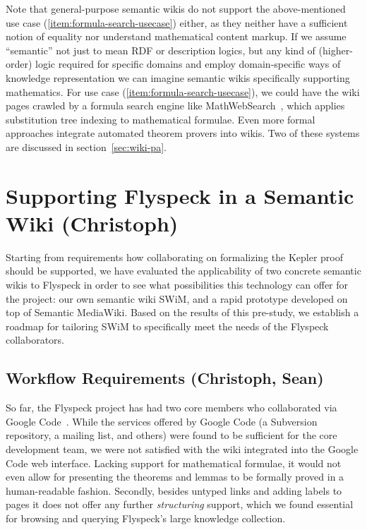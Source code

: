 \documentclass{llncs}
\begin{document}
Note that general-purpose semantic wikis do not support the above-mentioned use case
(\ref{item:formula-search-usecase}) either, as they neither have a sufficient notion of
equality nor understand mathematical content markup.  If we assume ``semantic'' not just
to mean RDF or description logics, but any kind of (higher-order) logic required for
specific domains and employ domain-specific ways of knowledge representation we can
imagine semantic wikis specifically supporting mathematics.  For use case
(\ref{item:formula-search-usecase}), we could have the wiki pages crawled by a formula
search engine like MathWebSearch~\cite{KohSuc:asemf06}, which applies substitution tree
indexing to mathematical formulae.  Even more formal approaches integrate automated
theorem provers into wikis.  Two of these systems are discussed in
section~\ref{sec:wiki-pa}.

\section{Supporting Flyspeck in a Semantic Wiki (Christoph)}

Starting from requirements how collaborating on formalizing the Kepler proof should be
supported, we have evaluated the applicability of two concrete semantic wikis to Flyspeck
in order to see what possibilities this technology can offer for the project:  our own
semantic wiki SWiM, and a rapid prototype developed on top of Semantic MediaWiki.  Based on the
results of this pre-study, we establish a roadmap for tailoring SWiM to specifically meet
the needs of the Flyspeck collaborators.

\subsection{Workflow Requirements (Christoph, Sean)}
\label{sec:req}

So far, the Flyspeck project has had two core members who
collaborated via Google Code~\cite{flyspeck:web}.  While the services offered by Google
Code (a Subversion repository, a mailing list, and others) were found to be sufficient for
the core development team, we were not satisfied with the wiki integrated into the Google
Code web interface.  Lacking support for mathematical formulae, it would not even allow
for presenting the theorems and lemmas to be formally proved in a human-readable fashion.
Secondly, besides untyped links and adding labels to pages it does not offer any further
\emph{structuring} support, which we found essential for browsing and querying Flyspeck's
large knowledge collection.
\end{document}
